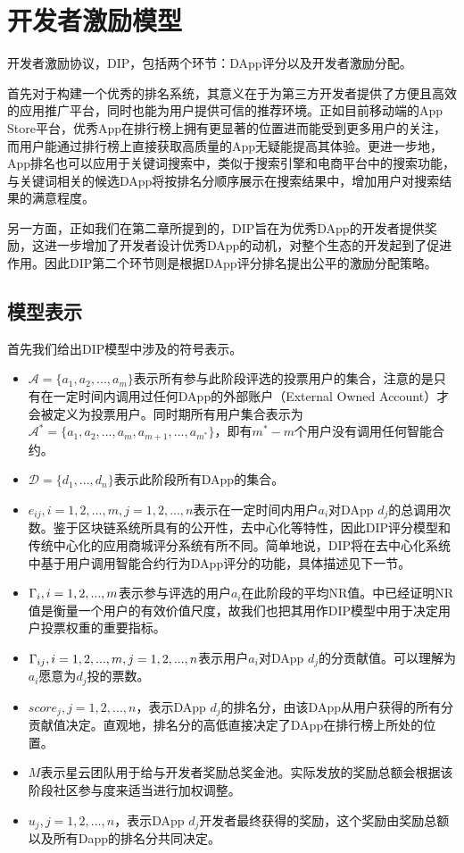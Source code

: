 \section{开发者激励模型}
开发者激励协议，DIP，包括两个环节：DApp评分以及开发者激励分配。

首先对于构建一个优秀的排名系统，其意义在于为第三方开发者提供了方便且高效的应用推广平台，同时也能为用户提供可信的推荐环境。正如目前移动端的App Store平台，优秀App在排行榜上拥有更显著的位置进而能受到更多用户的关注，而用户能通过排行榜上直接获取高质量的App无疑能提高其体验。更进一步地，App排名也可以应用于关键词搜索中，类似于搜索引擎和电商平台中的搜索功能，与关键词相关的候选DApp将按排名分顺序展示在搜索结果中，增加用户对搜索结果的满意程度。

另一方面，正如我们在第二章所提到的，DIP旨在为优秀DApp的开发者提供奖励，这进一步增加了开发者设计优秀DApp的动机，对整个生态的开发起到了促进作用。因此DIP第二个环节则是根据DApp评分排名提出公平的激励分配策略。

\subsection{模型表示}
\label{subsection:parameters}
首先我们给出DIP模型中涉及的符号表示。
\begin{itemize}
	\item $\mathcal{A}=\{a_1,a_2,...,a_m\}$表示所有参与此阶段评选的投票用户的集合，注意的是只有在一定时间内调用过任何DApp的外部账户（External Owned Account）才会被定义为投票用户。同时期所有用户集合表示为$\mathcal{A}^*=\{a_1,a_2,...,a_m,a_{m+1},...,a_{m^*}\}$，即有$m^*-m$个用户没有调用任何智能合约。
	\item $\mathcal{D}=\{d_1,...,d_n\}$表示此阶段所有DApp的集合。
	\item $e_{ij},i=1,2,...,m, j=1,2,...,n$表示在一定时间内用户$a_i$对DApp $d_j$的总调用次数。鉴于区块链系统所具有的公开性，去中心化等特性，因此DIP评分模型和传统中心化的应用商城评分系统有所不同。简单地说，DIP将在去中心化系统中基于用户调用智能合约行为DApp评分的功能，具体描述见下一节。
	\item $\Gamma_i, i=1,2,...,m$表示参与评选的用户$a_i$在此阶段的平均NR值。\cite{Nabulasyellowpaper}中已经证明NR值是衡量一个用户的有效价值尺度，故我们也把其用作DIP模型中用于决定用户投票权重的重要指标。
	\item $\Gamma_{ij}, i=1,2,...,m,j=1,2,...,n$表示用户$a_i$对DApp $d_j$的分贡献值。可以理解为$a_i$愿意为$d_j$投的票数。%
	\item $score_j, j=1,2,...,n$，表示DApp $d_j$的排名分，由该DApp从用户获得的所有分贡献值决定。直观地，排名分的高低直接决定了DApp在排行榜上所处的位置。%
	\item $M$表示星云团队用于给与开发者奖励总奖金池。实际发放的奖励总额会根据该阶段社区参与度来适当进行加权调整。
	\item $u_j, j=1,2,...,n$，表示DApp $d_j$开发者最终获得的奖励，这个奖励由奖励总额以及所有Dapp的排名分共同决定。%
\end{itemize}

